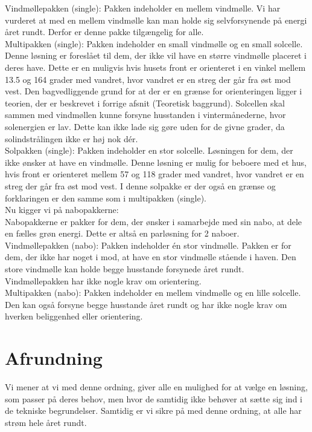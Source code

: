 \documentclass[12pt,a4paper]{article}
\theoremstyle{break}
\theoremstyle{nonumberplain}
\begin{document}
Vindmøllepakken (single): Pakken indeholder en mellem vindmølle. Vi har vurderet at med en mellem vindmølle kan man holde sig selvforsynende på energi året rundt. Derfor er denne pakke tilgængelig for alle. 
\\

Multipakken (single): Pakken indeholder en small vindmølle og en small solcelle. Denne løsning er foreslået til dem, der ikke vil have en større vindmølle placeret i deres have. Dette er en muligvis hvis husets front er orienteret i en vinkel mellem 13.5 og 164 grader med vandret, hvor vandret er en streg der går fra øst mod vest. Den bagvedliggende grund for at der er en grænse for orienteringen ligger i teorien, der er beskrevet i forrige afsnit (Teoretisk baggrund). Solcellen skal sammen med vindmøllen kunne forsyne husstanden i vintermånederne, hvor solenergien er lav. Dette kan ikke lade sig gøre uden for de givne grader, da solindstrålingen ikke er høj nok dér. 
\\

Solpakken (single): Pakken indeholder en stor solcelle. Løsningen for dem, der ikke ønsker at have en vindmølle. Denne løsning er mulig for beboere med et hus, hvis front er orienteret mellem 57 og 118 grader med vandret, hvor vandret er en streg der går fra øst mod vest. I denne solpakke er der også en grænse og forklaringen er den samme som i multipakken (single). 
\\

Nu kigger vi på nabopakkerne:
\\

Nabopakkerne er pakker for dem, der ønsker i samarbejde med sin nabo, at dele en fælles grøn energi. Dette er altså en parløsning for 2 naboer.
\\

Vindmøllepakken (nabo): Pakken indeholder én stor vindmølle. Pakken er for dem, der ikke har noget i mod, at have en stor vindmølle stående i haven. Den store vindmølle kan holde begge husstande forsynede året rundt. Vindmøllepakken har ikke nogle krav om orientering.
\\

Multipakken (nabo): Pakken indeholder en mellem vindmølle og en lille solcelle. Den kan også forsyne begge husstande året rundt og har ikke nogle krav om hverken beliggenhed eller orientering. 
\\



\section{Afrundning}
Vi mener at vi med denne ordning, giver alle en mulighed for at vælge en løsning, som passer på deres behov, men hvor de samtidig ikke behøver at sætte sig ind i de tekniske begrundelser. 
Samtidig er vi sikre på med denne ordning, at alle har strøm hele året rundt. 
\end{document}
